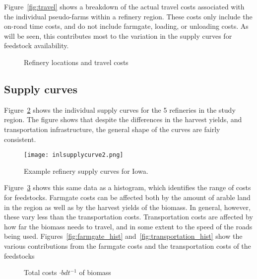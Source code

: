 \documentclass[review,3p,authoryear,times]{elsarticle}
\begin{document}
Figure~\ref{fig:travel} shows a breakdown of the actual travel costs
associated with the individual pseudo-farms within a refinery
region. These costs only include the on-road time costs, and do not
include farmgate, loading, or unloading costs.  As will be seen, this
contributes most to the variation in the supply curves for feedstock
availability.

\begin{figure}[hpt]
  \centering
    \caption{Refinery locations and travel costs}
    \label{fig:dest-travel}
\end{figure}


\subsection{Supply curves}

Figure~\ref{fig:supply_curves} shows the individual supply curves for
the 5 refineries in the study region.  The figure shows that despite
the differences in the harvest yields, and transportation
infrastructure, the general shape of the curves are fairly
consistent.

\begin{figure}[hpt]
  \centering
  \texttt{[image: inlsupplycurve2.png]}  
  \caption{Example refinery supply curves for Iowa. }
  \label{fig:supply_curves}
\end{figure}

Figure~\ref{fig:supply_curves_hist} shows this same data as a
histogram, which identifies the range of costs for feedstocks.
Farmgate costs can be affected both by the amount of arable land in
the region as well as by the harvest yields of the biomass.  In
general, however, these vary less than the transportation costs.
Transportation costs are affected by how far the biomass needs to
travel, and in some extent to the speed of the roads being used.
Figures~\ref{fig:farmgate_hist} and~\ref{fig:transportation_hist} show
the various contributions from the farmgate costs and the
transportation costs of the feedstocks

\begin{figure}[hpt]
  \centering
  \caption{Total costs $\cdot bdt^{-1}$ of biomass }
  \label{fig:supply_curves_hist}
\end{figure}
\end{document}
